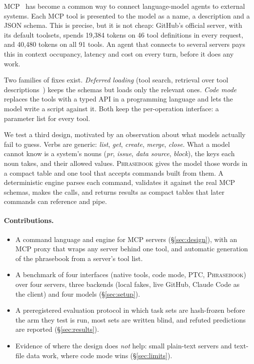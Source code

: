 \documentclass[11pt]{article}
\newcommand{\pb}{\textsc{Phrasebook}}
\begin{document}
MCP~\cite{mcp2024} has become a common way to connect language-model agents to external systems. Each MCP tool is presented to the model as a name, a description and a JSON schema. This is precise, but it is not cheap: GitHub's official server, with its default toolsets, spends 19,384 tokens on 46 tool definitions in every request, and 40,480 tokens on all 91 tools. An agent that connects to several servers pays this in context occupancy, latency and cost on every turn, before it does any work.

Two families of fixes exist. \emph{Deferred loading} (tool search, retrieval over tool descriptions~\cite{gan2025ragmcp,anthropic2025advanced}) keeps the schemas but loads only the relevant ones. \emph{Code mode}~\cite{cloudflare2025codemode,anthropic2025codeexec,wang2024codeact} replaces the tools with a typed API in a programming language and lets the model write a script against it. Both keep the per-operation interface: a parameter list for every tool.

We test a third design, motivated by an observation about what models actually fail to guess. Verbs are generic: \emph{list}, \emph{get}, \emph{create}, \emph{merge}, \emph{close}. What a model cannot know is a system's nouns (\emph{pr}, \emph{issue}, \emph{data source}, \emph{block}), the keys each noun takes, and their allowed values. \pb{} gives the model those words in a compact table and one tool that accepts commands built from them. A deterministic engine parses each command, validates it against the real MCP schemas, makes the calls, and returns results as compact tables that later commands can reference and pipe.

\paragraph{Contributions.}
\begin{itemize}
  \item A command language and engine for MCP servers (\S\ref{sec:design}), with an MCP proxy that wraps any server behind one tool, and automatic generation of the phrasebook from a server's tool list.
  \item A benchmark of four interfaces (native tools, code mode, PTC, \pb{}) over four servers, three backends (local fakes, live GitHub, Claude Code as the client) and four models (\S\ref{sec:setup}).
  \item A preregistered evaluation protocol in which task sets are hash-frozen before the arm they test is run, most sets are written blind, and refuted predictions are reported (\S\ref{sec:results}).
  \item Evidence of where the design does \emph{not} help: small plain-text servers and text-file data work, where code mode wins (\S\ref{sec:limits}).
\end{itemize}
\end{document}
